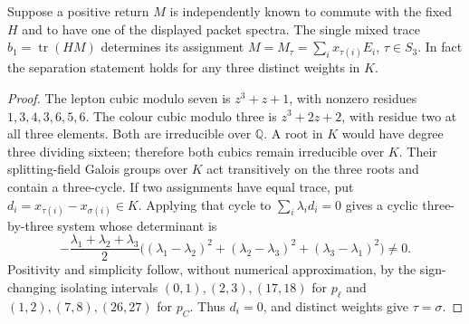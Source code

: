 \documentclass[11pt,a4paper]{article}
\begin{document}
\begin{theorem}
\label{p6:thm:v2109-one-moment-matching}
Suppose a positive return \(M\) is independently known to commute with the
fixed \(H\) and to have one of the displayed packet spectra.  The single
mixed trace \(b_1=\operatorname{tr}(HM)\) determines its assignment
\(M=M_\tau=\sum_i x_{\tau(i)}E_i\), \(\tau\in S_3\).  In fact the
separation statement holds for any three distinct weights in \(K\).
\end{theorem}
\begin{proof}
The lepton cubic modulo seven is \(z^3+z+1\), with nonzero residues
\(1,3,4,3,6,5,6\).  The colour cubic modulo three is \(z^3+2z+2\),
with residue two at all three elements.  Both are irreducible over
\(\mathbb Q\).  A root in \(K\) would have degree three dividing sixteen;
therefore both cubics remain irreducible over \(K\).  Their splitting-field
Galois groups over \(K\) act transitively on the three roots and contain a
three-cycle.  If two assignments have equal trace, put
\(d_i=x_{\tau(i)}-x_{\sigma(i)}\in K\).  Applying that cycle to
\(\sum_i\lambda_id_i=0\) gives a cyclic three-by-three system whose
determinant is
\[
 -\frac{\lambda_1+\lambda_2+\lambda_3}{2}
 \bigl((\lambda_1-\lambda_2)^2+(\lambda_2-\lambda_3)^2
 +(\lambda_3-\lambda_1)^2\bigr)\ne0.
\]
Positivity and simplicity follow, without numerical approximation, by the
sign-changing isolating intervals \((0,1),(2,3),(17,18)\) for \(p_\ell\)
and \((1,2),(7,8),(26,27)\) for \(p_C\).  Thus \(d_i=0\), and distinct
weights give \(\tau=\sigma\).
\end{proof}
\end{document}
